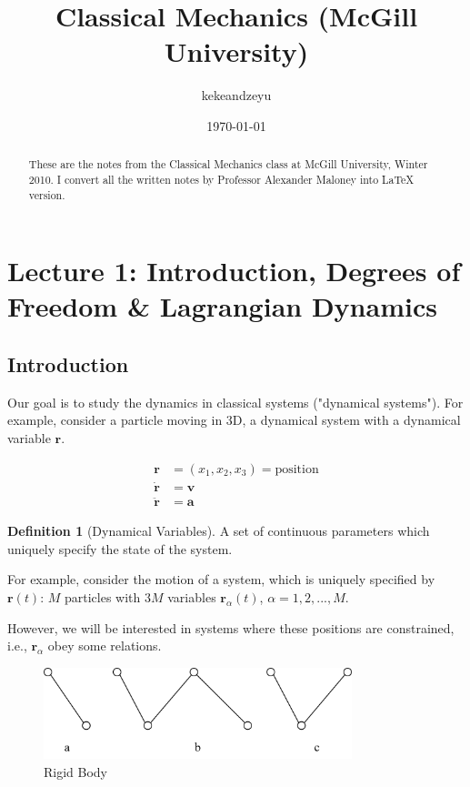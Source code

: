 \documentclass{article}
\title{Classical Mechanics (McGill University)}
\author{kekeandzeyu}
\date{\today}
\theoremstyle{definition}
\newtheorem{definition}{Definition}[section]
\theoremstyle{plain}
\theoremstyle{remark}
\begin{document}
\setlength{\parindent}{1.5em} 
\maketitle

\begin{abstract}
    These are the notes from the Classical Mechanics class at McGill University, Winter 2010. I convert all the written notes by Professor Alexander Maloney into LaTeX version.
\end{abstract}

\section{Lecture 1: Introduction, Degrees of Freedom \& Lagrangian Dynamics}

\subsection{Introduction}

Our goal is to study the dynamics in classical systems ("dynamical systems"). For example, consider a particle moving in 3D, a dynamical system with a dynamical variable $\mathbf{r}$.

\begin{align*}
    \mathbf{r} &= (x_1, x_2, x_3) = \text{position} \\
    \dot{\mathbf{r}} &= \mathbf{v} \\
    \ddot{\mathbf{r}} &= \mathbf{a} 
\end{align*}

\begin{definition}[Dynamical Variables]
    A set of continuous parameters which uniquely specify the state of the system.
\end{definition}

For example, consider the motion of a system, which is uniquely specified by $\mathbf{r}(t)$: $M$ particles with $3M$ variables $\mathbf{r}_\alpha(t)$, $\alpha=1,2,...,M$.

However, we will be interested in systems where these positions are constrained, i.e., $\mathbf{r}_\alpha$ obey some relations.

\begin{figure}[h]
  \centering
  \includegraphics[width=0.8\textwidth]{images/1-1-1.png}
  \caption{Rigid Body}
  \label{fig:1-1-1}
\end{figure}
\end{document}
